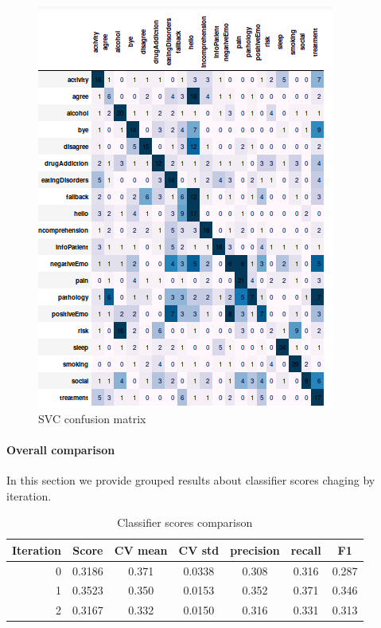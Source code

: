 \documentclass[11pt]{article}
\begin{document}
\begin{figure}[h]
	\centering
	\includegraphics[scale=0.40]{svc2_cm.png}
	\caption{SVC confusion matrix}
\label{lda_gm_cm}
\end{figure}
\FloatBarrier

\paragraph{Overall comparison}

In this section we provide grouped results about classifier scores chaging by iteration. 

\begin{table}[htb]
\begin{center}
\begin{tabular}{ |r|c|c|c|c|c|c| }
\hline
Iteration 	& Score  & CV mean & CV std & precision & recall & F1 \\ \hline
0			& 0.3186 & 0.371   & 0.0338 & 0.308 	& 0.316  & 0.287 \\ \hline
1			& 0.3523 & 0.350   & 0.0153 & 0.352 	& 0.371  & 0.346 \\ \hline
2 			& 0.3167 & 0.332   & 0.0150 & 0.316 	& 0.331  & 0.313 \\ \hline
\end{tabular}
\caption{Classifier scores comparison}
\end{center}
\end{table}
\FloatBarrier
\end{document}
